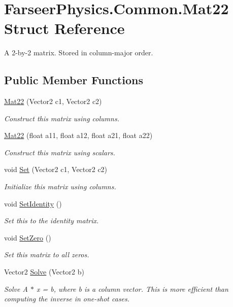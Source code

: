 \hypertarget{struct_farseer_physics_1_1_common_1_1_mat22}{\section{Farseer\+Physics.\+Common.\+Mat22 Struct Reference}
\label{struct_farseer_physics_1_1_common_1_1_mat22}
}


A 2-\/by-\/2 matrix. Stored in column-\/major order.  


\subsection*{Public Member Functions}
\begin{DoxyCompactItemize}
\item 
\hyperlink{struct_farseer_physics_1_1_common_1_1_mat22_ae8162285afc19822b689d7d798a99e49}{Mat22} (Vector2 c1, Vector2 c2)
\begin{DoxyCompactList}\small\item\em Construct this matrix using columns. \end{DoxyCompactList}\item 
\hyperlink{struct_farseer_physics_1_1_common_1_1_mat22_aa65e5c879aeea87294636d97ed2cddc2}{Mat22} (float a11, float a12, float a21, float a22)
\begin{DoxyCompactList}\small\item\em Construct this matrix using scalars. \end{DoxyCompactList}\item 
void \hyperlink{struct_farseer_physics_1_1_common_1_1_mat22_aede1191cceecf875a2b6ffc4829ff63a}{Set} (Vector2 c1, Vector2 c2)
\begin{DoxyCompactList}\small\item\em Initialize this matrix using columns. \end{DoxyCompactList}\item 
void \hyperlink{struct_farseer_physics_1_1_common_1_1_mat22_a707235e3da72229f790159d0ca3dfaf7}{Set\+Identity} ()
\begin{DoxyCompactList}\small\item\em Set this to the identity matrix. \end{DoxyCompactList}\item 
void \hyperlink{struct_farseer_physics_1_1_common_1_1_mat22_a827df16d61a5332e819fc7a6a72aa512}{Set\+Zero} ()
\begin{DoxyCompactList}\small\item\em Set this matrix to all zeros. \end{DoxyCompactList}\item 
Vector2 \hyperlink{struct_farseer_physics_1_1_common_1_1_mat22_ac94f7d183d7016e4042377b326d553a1}{Solve} (Vector2 b)
\begin{DoxyCompactList}\small\item\em Solve A $\ast$ x = b, where b is a column vector. This is more efficient than computing the inverse in one-\/shot cases. \end{DoxyCompactList}\end{DoxyCompactItemize}
